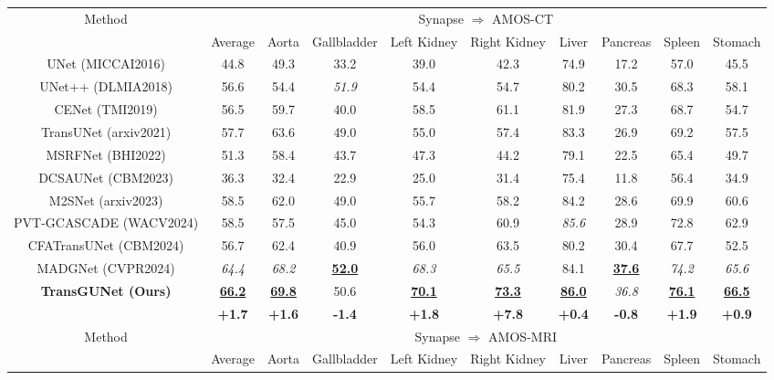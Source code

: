 \begin{table*}[t]
\begin{tabular}{c|c|cccccccc}
    \hline
    \multicolumn{1}{c|}{\multirow{2}{*}{Method}} & \multicolumn{9}{c}{Synapse $\Rightarrow$ AMOS-CT} \\ \cline{2-10}
     & Average & Aorta & Gallbladder & Left Kidney & Right Kidney & Liver & Pancreas & Spleen & Stomach \\
    \hline
    UNet \tiny{(MICCAI2016)}     & 44.8 & 49.3 & 33.2 & 39.0 & 42.3 & 74.9 & 17.2 & 57.0 & 45.5 \\
    UNet++ \tiny{(DLMIA2018)}    & 56.6 & 54.4 & \textit{51.9} & 54.4 & 54.7 & 80.2 & 30.5 & 68.3 & 58.1 \\
    CENet \tiny{(TMI2019)}       & 56.5 & 59.7 & 40.0 & 58.5 & 61.1 & 81.9 & 27.3 & 68.7 & 54.7 \\
    TransUNet \tiny{(arxiv2021)} & 57.7 & 63.6 & 49.0 & 55.0 & 57.4 & 83.3 & 26.9 & 69.2 & 57.5 \\
    MSRFNet \tiny{(BHI2022)}     & 51.3 & 58.4 & 43.7 & 47.3 & 44.2 & 79.1 & 22.5 & 65.4 & 49.7 \\
    DCSAUNet \tiny{(CBM2023)}    & 36.3 & 32.4 & 22.9 & 25.0 & 31.4 & 75.4 & 11.8 & 56.4 & 34.9 \\
    M2SNet \tiny{(arxiv2023)}    & 58.5 & 62.0 & 49.0 & 55.7 & 58.2 & 84.2 & 28.6 & 69.9 & 60.6 \\
    PVT-GCASCADE \tiny{(WACV2024)} & 58.5 & 57.5 & 45.0 & 54.3 & 60.9 & \textit{85.6} & 28.9 & 72.8 & 62.9 \\
    CFATransUNet \tiny{(CBM2024)} & 56.7 & 62.4 & 40.9 & 56.0 & 63.5 & 80.2 & 30.4 & 67.7 & 52.5 \\
    MADGNet \tiny{(CVPR2024)}    & \textit{64.4} & \textit{68.2} & \textbf{\underline{52.0}} & \textit{68.3} & \textit{65.5} & 84.1 & \textbf{\underline{37.6}} & \textit{74.2} & \textit{65.6} \\
    \hline
    \multicolumn{1}{c|}{\multirow{2}{*}{\textbf{TransGUNet \tiny{(Ours)}}}} & \textbf{\underline{66.2}} & \textbf{\underline{69.8}} & 50.6 & \textbf{\underline{70.1}} & \textbf{\underline{73.3}} & \textbf{\underline{86.0}} & \textit{36.8} & \textbf{\underline{76.1}} & \textbf{\underline{66.5}} \\ \cline{2-10}
    & \textbf{+1.7} & \textbf{+1.6} & \textbf{-1.4} & \textbf{+1.8} & \textbf{+7.8} & \textbf{+0.4} & \textbf{-0.8} & \textbf{+1.9} & \textbf{+0.9} \\
    \hline
    \multicolumn{1}{c|}{\multirow{2}{*}{Method}} & \multicolumn{9}{c}{Synapse $\Rightarrow$ AMOS-MRI} \\ \cline{2-10}
     & Average & Aorta & Gallbladder & Left Kidney & Right Kidney & Liver & Pancreas & Spleen & Stomach \\

\end{tabular}
\end{table*}
